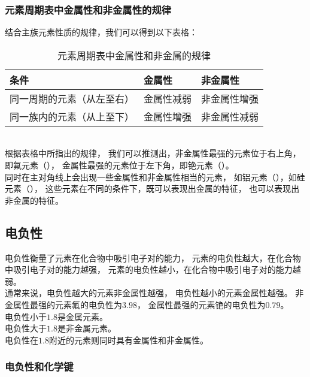 \documentclass[UTF8]{ctexart}
\begin{document}
\subsubsection{元素周期表中金属性和非金属性的规律}
    结合主族元素性质的规律，我们可以得到以下表格：
    \begin{table}[h]
        \begin{center}
            \begin{tabular}{l|l|l}
                \hline
                条件\qquad\qquad\qquad\qquad&金属性\qquad\qquad\qquad\qquad&非金属性\qquad\qquad\qquad\qquad\\ \hline
                同一周期的元素（从左至右）\qquad\qquad&金属性减弱&非金属性增强\\ \hline
                同一族内的元素（从上至下）\qquad\qquad&金属性增强&非金属性减弱\\ \hline
            \end{tabular}
            \caption{元素周期表中金属性和非金属的规律}
        \end{center}
    \end{table}\\
    根据表格中所指出的规律，
    我们可以推测出，非金属性最强的元素位于右上角，
    即氟元素（），
    金属性最强的元素位于左下角，即铯元素（）。\\[3mm]
    同时在主对角线上会出现一些金属性和非金属性相当的元素，
    如铝元素（），如硅元素（），
    这些元素在不同的条件下，既可以表现出金属的特征，
    也可以表现出非金属的特征。

\subsection{电负性}
    电负性衡量了元素在化合物中吸引电子对的能力，
    元素的电负性越大，在化合物中吸引电子对的能力越强，
    元素的电负性越小，在化合物中吸引电子对的能力越弱。\\[3mm]
    通常来说，电负性越大的元素非金属性越强，
    电负性越小的元素金属性越强。
    非金属性最强的元素氟的电负性为$3.98$，
    金属性最强的元素铯的电负性为$0.79$。\\[3mm]
    电负性小于$1.8$是金属元素。\\[2mm]
    电负性大于$1.8$是非金属元素。\\[2mm]
    电负性在$1.8$附近的元素则同时具有金属性和非金属性。

\subsubsection{电负性和化学键}
\end{document}
